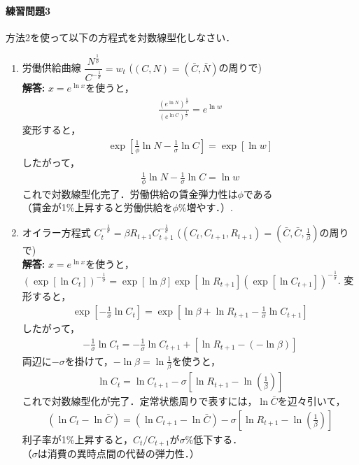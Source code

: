 \documentclass[a4paper,12pt,onecolumn,oneside,notitlepage,final]{article}
\begin{document}
\paragraph{練習問題3} 方法2を使って以下の方程式を対数線型化しなさい．
\begin{enumerate}
\item 労働供給曲線 $\dfrac{N^\frac{1}{\phi}}{C^{-\frac{1}{\sigma}}} = w_t$ \quad ($(C,N) = (\bar C, \bar N)$の周りで)\\

{\bf 解答:} $x = e^{\ln x}$を使うと，
\begin{align*}
\frac{\left(e^{\ln N}\right)^\frac{1}{\phi}}{\left(e^{\ln C}\right)^\frac{1}{\sigma}} = e^{\ln w}
\end{align*}
変形すると，
\begin{align*}
\exp\left[\frac{1}{\phi} \ln N - \frac{1}{\sigma}\ln C\right] = \exp\left[\ln w\right]
\end{align*}
したがって，
\begin{align*}
\frac{1}{\phi} \ln N - \frac{1}{\sigma}\ln C = \ln w
\end{align*}
これで対数線型化完了．労働供給の賃金弾力性は$\phi$である\\
（賃金が1\%上昇すると労働供給を$\phi \%$増やす．）.

\item オイラー方程式 $C_t^{-\frac{1}{\sigma}} = \beta R_{t+1} C_{t+1}^{-\frac{1}{\sigma}}$ \quad ($(C_t, C_{t+1}, R_{t+1}) = (\bar C, \bar C, \frac{1}{\beta})$の周りで)\\

{\bf 解答:} $x = e^{\ln x}$を使うと，$\left(\exp\left[\ln C_t\right]\right)^{-\frac{1}{\sigma}} = \exp\left[\ln \beta\right] \exp\left[\ln R_{t+1}\right] \left(\exp\left[\ln C_{t+1}\right]\right)^{-\frac{1}{\sigma}}$. 変形すると，
\begin{align*}
\exp\left[-\frac{1}{\sigma}\ln C_t\right] = \exp\left[\ln \beta + \ln R_{t+1} -\frac{1}{\sigma}\ln C_{t+1}\right]
\end{align*}
したがって，
\begin{align*}
-\frac{1}{\sigma}\ln C_t = -\frac{1}{\sigma}\ln C_{t+1} + \left[\ln R_{t+1} - (-\ln \beta)\right]
\end{align*}
両辺に$-\sigma$を掛けて，$-\ln \beta = \ln \frac{1}{\beta}$を使うと，
\begin{align*}
\ln C_t = \ln C_{t+1} -\sigma \left[\ln R_{t+1} - \ln \left(\frac{1}{\beta}\right)\right]
\end{align*}
これで対数線型化が完了．定常状態周りで表すには，$\ln \bar C$を辺々引いて，
\begin{align*}
(\ln C_t - \ln \bar C) = (\ln C_{t+1} - \ln \bar C) -\sigma \left[\ln R_{t+1} - \ln \left(\frac{1}{\beta}\right)\right]
\end{align*}
利子率が1\%上昇すると，$C_t/C_{t+1}$が$\sigma \%$低下する．\\
（$\sigma$は消費の異時点間の代替の弾力性．）


\end{enumerate}
\end{document}

